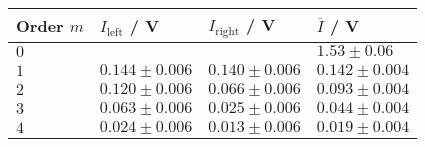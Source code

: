 	\begin{tabular}{|p{2.82cm}|p{2.82cm}|p{2.82cm}|p{2.82cm}|}
		\hline
		\rowcolor{tabcolor}
		Order $m$ & $I_\mathrm{left}$ / V & $I_\mathrm{right}$ / V & $\overline{I}$ / V  \\ \hline
		$0$ & 	 & 	& $1.53 \pm 0.06$ \\ 
		$1$ & $0.144 \pm 0.006$ & $0.140 \pm 0.006$ & $0.142 \pm 0.004$ \\ 
		$2$ & $0.120 \pm 0.006$ & $0.066 \pm 0.006$ & $0.093 \pm 0.004$ \\ 
		$3$ & $0.063 \pm 0.006$ & $0.025 \pm 0.006$ & $0.044 \pm 0.004$ \\ 
		$4$ & $0.024 \pm 0.006$ & $0.013 \pm 0.006$ & $0.019 \pm 0.004$ \\ 
		\hline
	\end{tabular}
